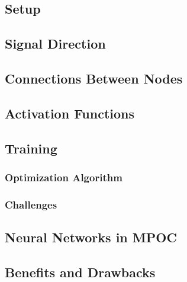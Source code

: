         \subsection{Setup} %

        \subsection{Signal Direction} %

        \subsection{Connections Between Nodes} %

        \subsection{Activation Functions} %

        \subsection{Training} %

            \subsubsection{Optimization Algorithm} %

            \subsubsection{Challenges} %

        \subsection{Neural Networks in MPOC} %

        \subsection{Benefits and Drawbacks} %

